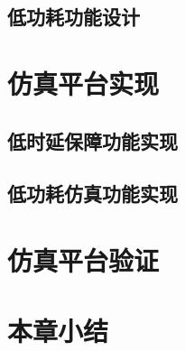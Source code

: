 \subsection{低功耗功能设计}

\section{仿真平台实现}

\subsection{低时延保障功能实现}

\subsection{低功耗仿真功能实现}

\section{仿真平台验证}

\section{本章小结}

